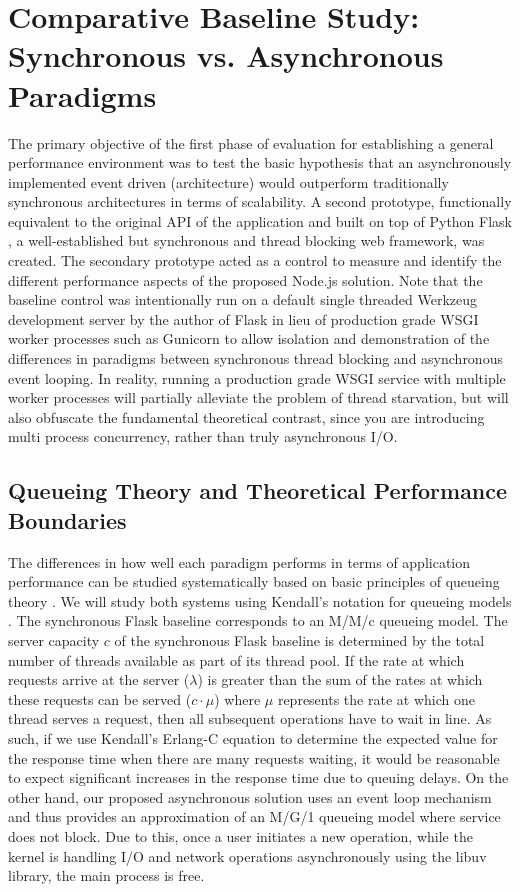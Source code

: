 \section{Comparative Baseline Study: Synchronous vs. Asynchronous Paradigms}
The primary objective of the first phase of evaluation for establishing a general performance environment was to test the basic hypothesis that an asynchronously implemented event driven (architecture) would outperform traditionally synchronous architectures in terms of scalability. A second prototype, functionally equivalent to the original API of the application and built on top of Python Flask \cite{chitra2017performance}, a well-established but synchronous and thread blocking web framework, was created. The secondary prototype acted as a control to measure and identify the different performance aspects of the proposed Node.js solution. Note that the baseline control was intentionally run on a default single threaded Werkzeug development server by the author of Flask in lieu of production grade WSGI worker processes such as Gunicorn to allow isolation and demonstration of the differences in paradigms between synchronous thread blocking and asynchronous event looping. In reality, running a production grade WSGI service with multiple worker processes will partially alleviate the problem of thread starvation, but will also obfuscate the fundamental theoretical contrast, since you are introducing multi process concurrency, rather than truly asynchronous I/O.
\subsection{Queueing Theory and Theoretical Performance Boundaries}
The differences in how well each paradigm performs in terms of application performance can be studied systematically based on basic principles of queueing theory \cite{kleinrock1975}. We will study both systems using Kendall's notation for queueing models \cite{kendall1953}. The synchronous Flask baseline corresponds to an M/M/c queueing model. The server capacity $c$ of the synchronous Flask baseline is determined by the total number of threads available as part of its thread pool. If the rate at which requests arrive at the server ($\lambda$) is greater than the sum of the rates at which these requests can be served ($c \cdot \mu$) where $\mu$ represents the rate at which one thread serves a request, then all subsequent operations have to wait in line. As such, if we use Kendall's Erlang-C equation to determine the expected value for the response time when there are many requests waiting, it would be reasonable to expect significant increases in the response time due to queuing delays. On the other hand, our proposed asynchronous solution uses an event loop mechanism and thus provides an approximation of an M/G/1 queueing model where service does not block. Due to this, once a user initiates a new operation, while the kernel is handling I/O and network operations asynchronously using the libuv library, the main process is free.

